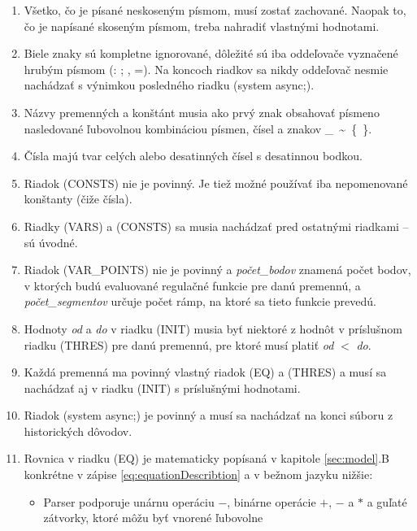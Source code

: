 \documentclass[11pt,final,oneside]{fithesis}
\begin{document}
\begin{enumerate}
\item V\v setko, \v co je p\'isan\'e neskosen\'ym p\'ismom, mus\'i zosta\v t zachovan\'e. Naopak to, \v co je nap\'isan\'e skosen\'ym p\'ismom, treba 
nahradi\v t vlastn\'ymi hodnotami.
\item Biele znaky s\'u kompletne ignorovan\'e, d\^ ole\v zit\'e s\'u iba odde\v lova\v ce vyzna\v cen\'e hrub\'ym p\'ismom (: ; , =). Na koncoch riadkov sa 
nikdy odde\v lova\v c nesmie nach\'adza\v t s v\'ynimkou posledn\'eho riadku (system async;).
\item N\'azvy premenn\'ych a kon\v st\'ant musia ako prv\'y znak obsahova\v t p\'ismeno nasledovan\'e \v lubovolnou kombin\'aciou p\'ismen, \v c\'isel a 
znakov \_\ \textasciitilde{}\ \{\ \}.
\item \v C\'isla maj\'u tvar cel\'ych alebo desatinn\'ych \v c\'isel s desatinnou bodkou.
\item Riadok (CONSTS) nie je povinn\'y. Je tie\v z mo\v zn\'e pou\v z\'iva\v t iba nepomenovan\'e kon\v stanty (\v ci\v ze \v c\'isla).
\item Riadky (VARS) a (CONSTS) sa musia nach\'adza\v t pred ostatn\'ymi riadkami -- s\'u \'uvodn\'e.
\item Riadok (VAR\_POINTS) nie je povinn\'y a \textit{po\v cet\_bodov} znamen\'a po\v cet bodov, v ktor\'ych bud\'u evaluovan\'e regula\v cn\'e funkcie 
pre dan\'u premenn\'u, a {\it po\v cet\_segmentov} ur\v cuje po\v cet r\'amp, na ktor\'e sa tieto funkcie preved\'u.
\item Hodnoty {\it od} a {\it do} v riadku (INIT) musia by\v t niektor\'e z hodn\^ ot v pr\'islu\v snom riadku (THRES) pre dan\'u premenn\'u, pre ktor\'e
mus\'i plati\v t {\it od} $<$ {\it do}.
\item Ka\v zd\'a premenn\'a ma povinn\'y vlastn\'y riadok (EQ) a (THRES) a mus\'i sa nach\'adza\v t aj v riadku (INIT) s pr\'islu\v sn\'ymi hodnotami.
\item Riadok (system async;) je povinn\'y a mus\'i sa nach\'adza\v t na konci s\'uboru z historick\'ych d\^ ovodov.
\item Rovnica v riadku (EQ) je matematicky pop\'isan\'a v kapitole \ref{sec:model}.B konkr\'etne v z\'apise \ref{eq:equationDescribtion} a v be\v znom jazyku 
ni\v z\v sie:
\begin{itemize}
\item Parser podporuje un\'arnu oper\'aciu $-$, bin\'arne oper\'acie $+$, $-$ a $*$ a gu\v lat\'e z\'atvorky, ktor\'e m\^ o\v zu by\v t vnoren\'e \v lubovolne

\end{itemize}
\end{enumerate}
\end{document}
